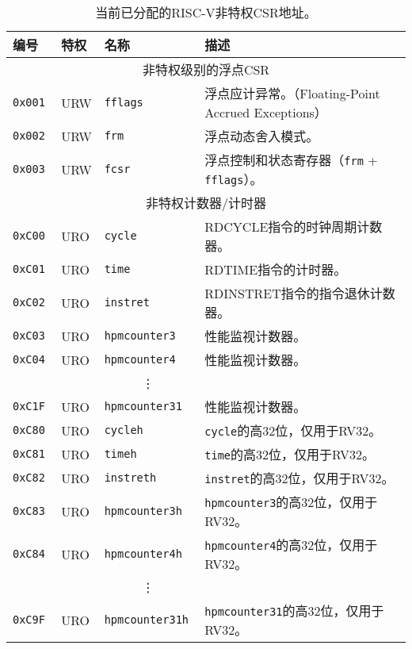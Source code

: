 \begin{table}[htb!]
\begin{center}
\begin{tabular}{|l|l|l|l|}
\hline
编号    & 特权 & 名称 & 描述 \\
\hline
\multicolumn{4}{|c|}{非特权级别的浮点CSR} \\
\hline
\tt 0x001 & URW  &\tt fflags     & 浮点应计异常。（Floating-Point Accrued Exceptions） \\
\tt 0x002 & URW  &\tt frm        & 浮点动态舍入模式。 \\
\tt 0x003 & URW  &\tt fcsr       & 浮点控制和状态寄存器（{\tt frm} + {\tt fflags}）。\\
\hline
\multicolumn{4}{|c|}{非特权计数器/计时器} \\
\hline
\tt 0xC00 & URO  &\tt cycle         & RDCYCLE指令的时钟周期计数器。 \\
\tt 0xC01 & URO  &\tt time          & RDTIME指令的计时器。 \\
\tt 0xC02 & URO  &\tt instret       & RDINSTRET指令的指令退休计数器。 \\
\tt 0xC03 & URO  &\tt hpmcounter3   & 性能监视计数器。 \\
\tt 0xC04 & URO  &\tt hpmcounter4   & 性能监视计数器。 \\
& & \multicolumn{1}{c|}{\vdots} & \ \\
\tt 0xC1F & URO  &\tt hpmcounter31  & 性能监视计数器。 \\
\tt 0xC80 & URO  &\tt cycleh        & {\tt cycle}的高32位，仅用于RV32。 \\
\tt 0xC81 & URO  &\tt timeh         & {\tt time}的高32位，仅用于RV32。 \\
\tt 0xC82 & URO  &\tt instreth      & {\tt instret}的高32位，仅用于RV32。 \\
\tt 0xC83 & URO  &\tt hpmcounter3h  & {\tt hpmcounter3}的高32位，仅用于RV32。 \\
\tt 0xC84 & URO  &\tt hpmcounter4h  & {\tt hpmcounter4}的高32位，仅用于RV32。 \\
& & \multicolumn{1}{c|}{\vdots} & \ \\
\tt 0xC9F & URO  &\tt hpmcounter31h & {\tt hpmcounter31}的高32位，仅用于RV32。 \\
\hline
\end{tabular}
\end{center}
\caption{当前已分配的RISC-V非特权CSR地址。
    }
\label{ucsrnames}
\end{table}

